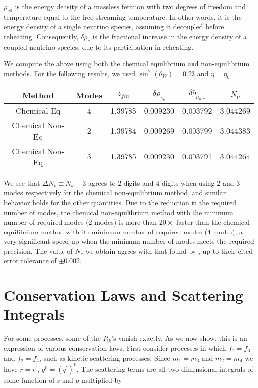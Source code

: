  $\rho_{\nu0}$ is the energy density of a massless fermion with two degrees of freedom and temperature equal to the free-streaming temperature.  In other words, it is the energy density of a single neutrino species, assuming it decoupled before reheating. Consequently, $\delta\bar\rho_\nu$ is the fractional increase in the energy density of a coupled neutrino species, due to its participation in reheating.

We compute the above using both the chemical equilibrium and non-equilibrium methods. For the following results, we used $\sin^2(\theta_W)=0.23$ and $\eta=\eta_0$. 
\begin{table}[h]\label{table:method_comp}
\centering 
\begin{tabular}{|c|c|c|c|c|c|}
\hline
Method &Modes&$z_{fin}$ & $\delta\bar\rho_{\nu_e}$&   $\delta\bar\rho_{\nu_{\mu,\tau}}$ & $N_{\nu}$  \\
\hline
Chemical Eq& 4 &1.39785 &0.009230 &0.003792 &3.044269\\
\hline
Chemical Non-Eq& 2&1.39784 &0.009269 & 0.003799&3.044383 \\
\hline
Chemical Non-Eq& 3&1.39785&0.009230 & 0.003791&3.044264 \\
\hline
\end{tabular}
\end{table}
We see that $\Delta N_\nu\equiv N_\nu-3$ agrees to $2$ digits and $4$ digits when using $2$ and $3$ modes respectively for the chemical non-equilibrium method, and similar behavior holds for the other quantities. Due to the reduction in the required number of modes, the chemical non-equilibrium method with the minimum number of required modes ($2$ modes) is more than $20\times$ faster than the chemical equilibrium method with its minimum number of required modes ($4$ modes), a very significant speed-up when the minimum number of modes meets the required precision.  The value of $N_\nu$ we obtain agrees with that found by \cite{Mangano2005}, up to their cited error tolerance of $\pm 0.002$.

\section{Conservation Laws and Scattering Integrals}
For some processes, some of the $R_k$'s vanish exactly.  As we now show, this is an expression of various conservation laws. First consider processes in which $f_1=f_3$ and $f_2=f_4$, such as kinetic scattering processes. Since $m_1=m_3$ and $m_2=m_4$ we have $r=r^{'}$, $q^0=(q^{'})^0$.  The scattering terms are all two dimensional integrals of some function of $s$ and $p$ multiplied by 

